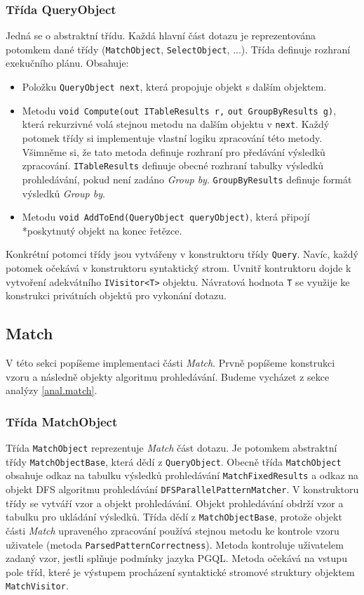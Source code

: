 \subsubsection{Třída QueryObject}

Jedná se o abstraktní třídu.
Každá hlavní část dotazu je reprezentována potomkem dané třídy (\texttt{MatchObject}, \texttt{SelectObject}, ...).
Třída definuje rozhraní exekučního plánu.
Obsahuje:
\begin{itemize}
\item Položku \texttt{QueryObject next}, která propojuje objekt s dalším objektem.
\item Metodu \texttt{void Compute(out ITableResults r,} \texttt{out GroupByResults g)}, která rekurzivné volá stejnou metodu na dalším objektu v \texttt{next}.
Každý potomek třídy si implementuje vlastní logiku zpracování této metody.
Všimněme si, že tato metoda definuje rozhraní pro předávání výsledků zpracování.
\texttt{ITableResults} definuje obecné rozhraní tabulky výsledků prohledávání, pokud není zadáno \textit{Group by}.
\texttt{GroupByResults} definuje formát výsledků \textit{Group by}.
\item Metodu \texttt{void AddToEnd(QueryObject queryObject)}, která připojí \\*poskytnutý objekt na konec řetězce.
\end{itemize}
Konkrétní potomci třídy jsou vytvářeny v konstruktoru třídy \texttt{Query}.
Navíc, každý potomek očekává v konstruktoru syntaktický strom.
Uvnitř kontruktoru dojde k vytvoření adekvátního \texttt{IVisitor<T>} objektu.
Návratová hodnota \texttt{T} se využije ke konstrukci privátních objektů pro vykonání dotazu.

\subsection{Match} \label{impl.match}

V této sekci popíšeme implementaci části \textit{Match}.
Prvně popíšeme konstrukci vzoru a následně objekty algoritmu prohledávání.
Budeme vycházet z sekce analýzy \ref{anal.match}.

\subsubsection{Třída MatchObject}

Třída \texttt{MatchObject} reprezentuje \textit{Match} část dotazu.
Je potomkem abstraktní třídy \texttt{MatchObjectBase}, která dědí z \texttt{QueryObject}.
Obecně třída \texttt{MatchObject} obsahuje odkaz na tabulku výsledků prohledávání \texttt{MatchFixedResults} a odkaz na objekt DFS algoritmu prohledávání \texttt{DFSParallelPatternMatcher}.
V konstruktoru třídy se vytváří vzor a objekt prohledávání.
Objekt prohledávání obdrží vzor a tabulku pro ukládání výsledků.
Třída dědí z \texttt{MatchObjectBase}, protože objekt části \textit{Match} upraveného zpracování používá stejnou metodu ke kontrole vzoru uživatele (metoda \texttt{ParsedPatternCorrectness}).
Metoda kontroluje uživatelem zadaný vzor, jestli splňuje podmínky jazyka PGQL. 
Metoda očekává na vstupu pole tříd, které je výstupem procházení syntaktické stromové struktury objektem \texttt{MatchVisitor}. 

